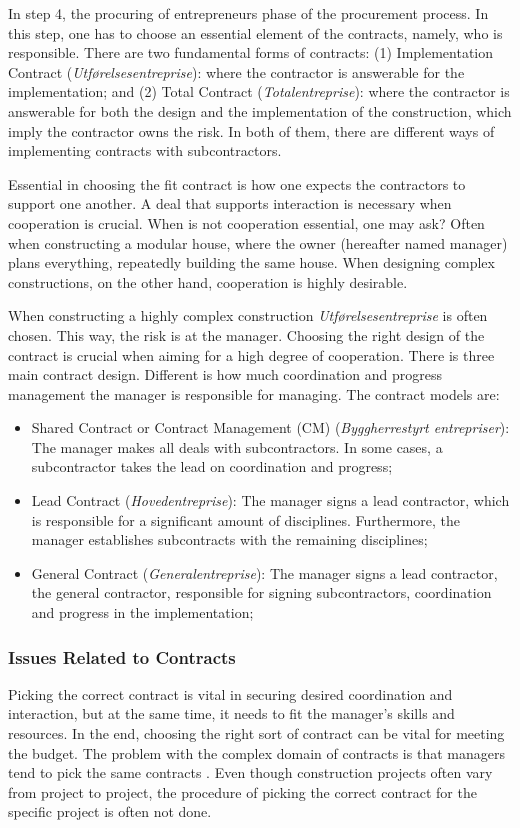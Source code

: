 In step 4, the procuring of entrepreneurs phase of the procurement process. In this step, one has to choose an essential element of the contracts, namely, who is responsible. There are two fundamental forms of contracts: (1) Implementation Contract (\textit{Utførelsesentreprise}): where the contractor is answerable for the implementation; and (2) Total Contract (\textit{Totalentreprise}): where the contractor is answerable for both the design and the implementation of the construction, which imply the contractor owns the risk. In both of them, there are different ways of implementing contracts with subcontractors. 

Essential in choosing the fit contract is how one expects the contractors to support one another. A deal that supports interaction is necessary when cooperation is crucial. When is not cooperation essential, one may ask? Often when constructing a modular house, where the owner (hereafter named manager) plans everything, repeatedly building the same house. When designing complex constructions, on the other hand, cooperation is highly desirable. 

When constructing a highly complex construction \textit{Utførelsesentreprise} is often chosen. This way, the risk is at the manager. Choosing the right design of the contract is crucial when aiming for a high degree of cooperation. There is three main contract design. Different is how much coordination and progress management the manager is responsible for managing. The contract models are: 

\begin{itemize}
    \item Shared Contract or Contract Management (CM) (\textit{Byggherrestyrt entrepriser}): The manager makes all deals with subcontractors. In some cases, a subcontractor takes the lead on coordination and progress;
    \item Lead Contract (\textit{Hovedentreprise}): The manager signs a lead contractor, which is responsible for a significant amount of disciplines. Furthermore, the manager establishes subcontracts with the remaining disciplines; 
    \item General Contract (\textit{Generalentreprise}): The manager signs a lead contractor, the general contractor, responsible for signing subcontractors, coordination and progress in the implementation;
\end{itemize}

\subsubsection*{Issues Related to Contracts}
Picking the correct contract is vital in securing desired coordination and interaction, but at the same time, it needs to fit the manager's skills and resources. In the end, choosing the right sort of contract can be vital for meeting the budget. The problem with the complex domain of contracts is that managers tend to pick the same contracts \cite{laedre2006procurement}. Even though construction projects often vary from project to project, the procedure of picking the correct contract for the specific project is often not done.

